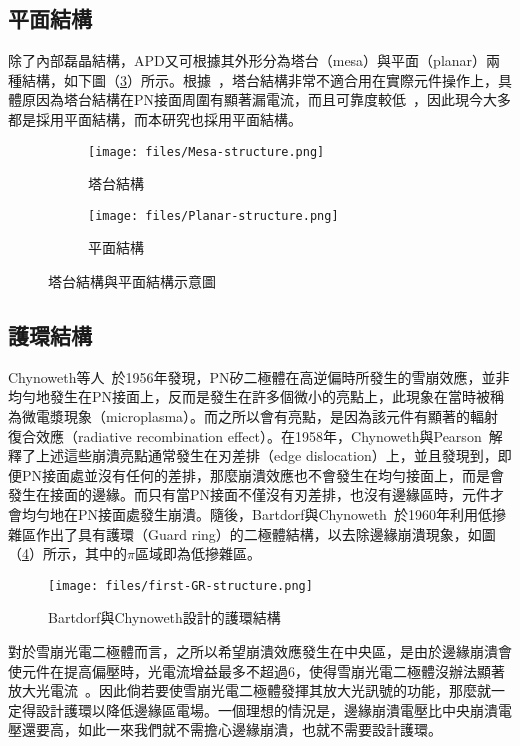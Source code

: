 \subsection{平面結構}
除了內部磊晶結構，APD又可根據其外形分為塔台（mesa）與平面（planar）兩種結構，如下圖（\ref{fig:Mesa-Planar-structure}）所示。根據~\cite{forrest1989avalanche}，塔台結構非常不適合用在實際元件操作上，具體原因為塔台結構在PN接面周圍有顯著漏電流，而且可靠度較低~\cite{ando1981ingaas}，因此現今大多都是採用平面結構，而本研究也採用平面結構。
\begin{figure}[h]
\centering
\begin{subfigure}{.45\textwidth}
\centering
\texttt{[image: files/Mesa-structure.png]}
\caption{塔台結構}
\label{fig:mesa}
\end{subfigure}
\begin{subfigure}{.45\textwidth}
\centering
\texttt{[image: files/Planar-structure.png]}
\caption{平面結構}
\label{fig:planar}
\end{subfigure}
\caption{塔台結構與平面結構示意圖}
\label{fig:Mesa-Planar-structure}
\end{figure}
\subsection{護環結構}
Chynoweth等人~\cite{chynoweth1956photon}於1956年發現，PN矽二極體在高逆偏時所發生的雪崩效應，並非均勻地發生在PN接面上，反而是發生在許多個微小的亮點上，此現象在當時被稱為微電漿現象（microplasma）。而之所以會有亮點，是因為該元件有顯著的輻射復合效應（radiative recombination effect）。在1958年，Chynoweth與Pearson~\cite{chynoweth1958effect}解釋了上述這些崩潰亮點通常發生在刃差排（edge dislocation）上，並且發現到，即便PN接面處並沒有任何的差排，那麼崩潰效應也不會發生在均勻接面上，而是會發生在接面的邊緣。而只有當PN接面不僅沒有刃差排，也沒有邊緣區時，元件才會均勻地在PN接面處發生崩潰。隨後，Bartdorf與Chynoweth~\cite{batdorf1960uniform}於1960年利用低摻雜區作出了具有護環（Guard ring）的二極體結構，以去除邊緣崩潰現象，如圖（\ref{fig:first-GR-structure}）所示，其中的$\pi$區域即為低摻雜區。

\begin{figure}[h]
\centering
\texttt{[image: files/first-GR-structure.png]}
\caption[Bartdorf與Chynoweth設計的護環結構]{Bartdorf與Chynoweth設計的護環結構~\cite{batdorf1960uniform}}
\label{fig:first-GR-structure}
\end{figure}

對於雪崩光電二極體而言，之所以希望崩潰效應發生在中央區，是由於邊緣崩潰會使元件在提高偏壓時，光電流增益最多不超過$6$，使得雪崩光電二極體沒辦法顯著放大光電流~\cite{ando1981ingaas}。因此倘若要使雪崩光電二極體發揮其放大光訊號的功能，那麼就一定得設計護環以降低邊緣區電場。一個理想的情況是，邊緣崩潰電壓比中央崩潰電壓還要高，如此一來我們就不需擔心邊緣崩潰，也就不需要設計護環。


